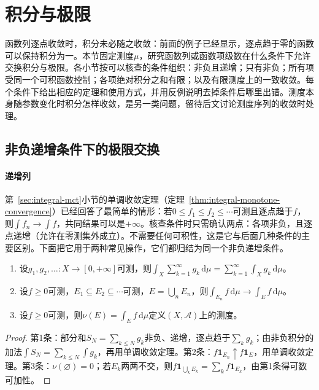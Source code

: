 \section{积分与极限}
\label{sec:integral-limits}

函数列逐点收敛时，积分未必随之收敛：前面的例子已经显示，逐点趋于零的函数可以保持积分为一。本节固定测度$\mu$，研究函数列或函数项级数在什么条件下允许交换积分与极限。各小节按可以核查的条件组织：非负且递增；只有非负；所有项受同一个可积函数控制；各项绝对积分之和有限；以及有限测度上的一致收敛。每个条件下给出相应的定理和使用方式，并用反例说明去掉条件后哪里出错。测度本身随参数变化时积分怎样收敛，是另一类问题，留待后文讨论测度序列的收敛时处理。

\subsection{非负递增条件下的极限交换}
\label{sec:integral-limits-monotone}

\paragraph{递增列}
第~\ref{sec:integral-mct}小节的单调收敛定理（定理~\ref{thm:integral-monotone-convergence}）已经回答了最简单的情形：若$0\le f_1\le f_2\le\cdots$可测且逐点趋于$f$，则$\int f_n\to\int f$，共同结果可以是$+\infty$。核查条件时只需确认两点：各项非负，且逐点递增（允许在零测集外成立）。不需要任何可积性，这是它与后面几种条件的主要区别。下面把它用于两种常见操作，它们都归结为同一个非负递增条件。

\begin{theorem}[非负级数的逐项积分与递增区域]
\label{thm:integral-series-nonnegative}
\begin{enumerate}
 \item 设$g_1,g_2,\dots:X\to[0,+\infty]$可测，则$\int_X\sum_{k=1}^\infty g_k\,\mathrm d\mu=\sum_{k=1}^\infty\int_Xg_k\,\mathrm d\mu$。
 \item 设$f\ge0$可测，$E_1\subseteq E_2\subseteq\cdots$可测，$E=\bigcup_nE_n$，则$\int_{E_n}f\,\mathrm d\mu\to\int_Ef\,\mathrm d\mu$。
 \item 设$f\ge0$可测，则$\nu(E)=\int_Ef\,\mathrm d\mu$定义$(X,\mathcal A)$上的测度。
\end{enumerate}
\end{theorem}

\begin{proof}
第1条：部分和$S_N=\sum_{k\le N}g_k$非负、递增，逐点趋于$\sum_kg_k$；由非负积分的加法$\int S_N=\sum_{k\le N}\int g_k$，再用单调收敛定理。第2条：$f\mathbf 1_{E_n}\uparrow f\mathbf 1_E$，用单调收敛定理。第3条：$\nu(\varnothing)=0$；若$E_k$两两不交，则$f\mathbf 1_{\bigcup_kE_k}=\sum_kf\mathbf 1_{E_k}$，由第1条得可数可加性。
\end{proof}

